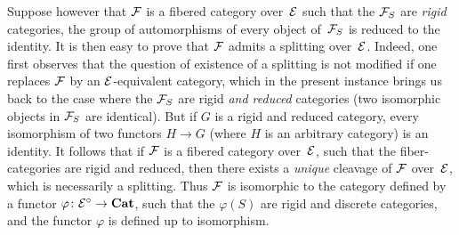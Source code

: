 Suppose however that $\cal{F}$ is a fibered category
over~$\cal{E}$ such that the
$\cal{F}_S$ are \emph{rigid} categories, \ie the group
of automorphisms of every object of~$\cal{F}_S$ is reduced to
the identity. It is then easy to prove that $\cal{F}$ admits a
splitting over~$\cal{E}$. Indeed, one first observes that the question
of existence of a splitting is not modified if one replaces
$\cal{F}$ by an $\cal{E}$-equivalent category, which in the present
instance brings us back to the case where the $\cal{F}_S$ are
rigid \emph{and reduced} categories (\ie two isomorphic
objects in $\cal{F}_S$ are identical). But if $G$ is a
rigid and reduced category, every isomorphism of two
functors $H\to G$ (where $H$ is an arbitrary category) is
an identity. It follows that if $\cal{F}$ is a
fibered category over~$\cal{E}$, such that the fiber-categories are
rigid and reduced, then there exists a \emph{unique} cleavage of
$\cal{F}$ over~$\cal{E}$, which is necessarily a splitting. Thus
$\cal{F}$ is isomorphic to the category defined by a
functor $\varphi\colon \cal{E}^\circ\to \Cat$, such that the
$\varphi(S)$ are rigid and discrete categories, and the
functor $\varphi$ is defined up to isomorphism.

